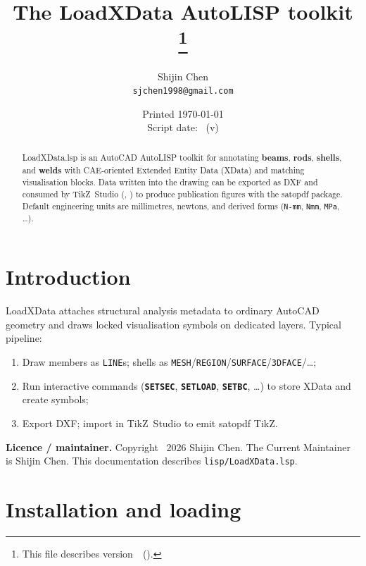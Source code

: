 \documentclass[a4paper]{ltxdoc}
\title{%
  The \textsf{LoadXData} AutoLISP toolkit%
  \thanks{This file describes version~\fileversion\ (\filedate).}%
}
\author{%
  Shijin Chen\\
  \texttt{sjchen1998@gmail.com}%
}
\date{Printed \today\\[0.5em] Script date: \filedate\ (v\fileversion)}
\newcommand{\cadcmd}[1]{\texttt{\textbf{#1}}}
\begin{document}
\maketitle

\begin{abstract}
\textsf{LoadXData.lsp} is an AutoCAD AutoLISP toolkit for annotating
\textbf{beams}, \textbf{rods}, \textbf{shells}, and \textbf{welds} with
CAE-oriented Extended Entity Data (XData) and matching visualisation
blocks.  Data written into the drawing can be exported as DXF and consumed
by TikZ~Studio
(, )
to produce publication figures with the \textsf{satopdf} package.
Default engineering units are millimetres, newtons, and derived forms
(\texttt{N-mm}, \texttt{Nmm}, \texttt{MPa}, \ldots).
\end{abstract}

\tableofcontents
\clearpage

\section{Introduction}

\textsf{LoadXData} attaches structural analysis metadata to ordinary AutoCAD
geometry and draws locked visualisation symbols on dedicated layers.  Typical
pipeline:

\begin{enumerate}[nosep]
  \item Draw members as \texttt{LINE}s; shells as
        \texttt{MESH}/\texttt{REGION}/\texttt{SURFACE}/\texttt{3DFACE}/\ldots;
  \item Run interactive commands (\cadcmd{SETSEC}, \cadcmd{SETLOAD},
        \cadcmd{SETBC}, \ldots) to store XData and create symbols;
  \item Export DXF; import in TikZ~Studio to emit \textsf{satopdf} TikZ.
\end{enumerate}

\noindent\textbf{Licence / maintainer.}
Copyright \textcopyright\ 2026 Shijin Chen.
The Current Maintainer is Shijin Chen.
This documentation describes \texttt{lisp/LoadXData.lsp}.

\section{Installation and loading}
\end{document}
